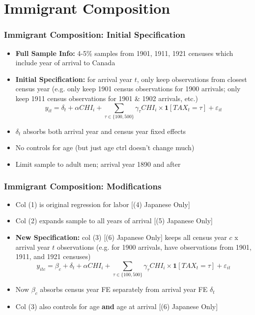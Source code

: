 \documentclass[pdf]{beamer}
\begin{document}
\section{Immigrant Composition}
\begin{frame}[label = tab3_old_spec]
    \frametitle{Immigrant Composition: Initial Specification}
    \centering
    \begin{itemize}
        \item \textbf{Full Sample Info:} 4-5\% samples from 1901, 1911, 1921 censuses which include year of arrival to Canada
        \item \textbf{Initial Specification:} for arrival year $t$, only keep observations from closest census year (e.g. only keep 1901 census observations for 1900 arrivals; only keep 1911 census observations for 1901 \& 1902 arrivals, etc.)
        \begin{equation*}
            y_{it} = \delta_t + \alpha CHI_i + \sum_{\tau \in \{100,500\}} \gamma_{\tau} CHI_i \times \mathbf{1}[TAX_t = \tau] + \varepsilon_{it}
        \end{equation*}
        \item $\delta_t$ absorbs both arrival year and census year fixed effects 
        \item No controls for age (but just age ctrl doesn't change much)
        \item Limit sample to adult men; arrival year 1890 and after
    \end{itemize}
    \hyperlink{tab3_old}{}
\end{frame}

\begin{frame}[label = tab3_new_spec1]
    \frametitle{Immigrant Composition: Modifications}
    \centering
    \begin{itemize}
        \item Col (1) is original regression for labor [(4) Japanese Only]
        \item Col (2) expands sample to all years of arrival [(5) Japanese Only]
        \item \textbf{New Specification:} col (3) [(6) Japanese Only] keeps all census year $c$ x arrival year $t$ observations (e.g. for 1900 arrivals, have observations from 1901, 1911, and 1921 censuses)
        \begin{equation*}
            y_{itc} = \beta_c + \delta_t + \alpha CHI_i + \sum_{\tau \in \{100,500\}} \gamma_{\tau} CHI_i \times \mathbf{1}[TAX_t = \tau] + \varepsilon_{it}
        \end{equation*}
        \item Now $\beta_c$ absorbs census year FE separately from arrival year FE $\delta_t$ 
        \item Col (3) also controls for age \textbf{and} age at arrival [(6) Japanese Only]
    \end{itemize}
\end{frame}
\end{document}

